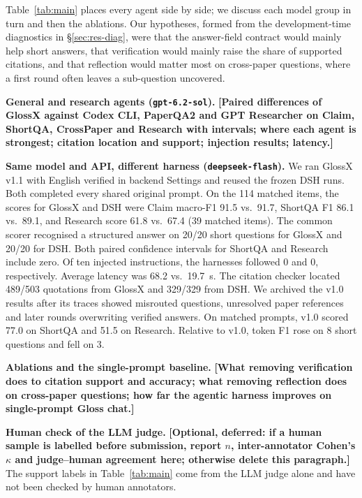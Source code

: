 \documentclass{article}
\newcommand{\sysname}{GlossX}
\newcommand{\gloss}{Gloss}
\newcommand{\ds}[1]{\textsf{#1}}
\newcommand{\TBD}[1]{\textcolor{glred}{\textbf{[#1]}}}
\newcommand{\code}[1]{\texttt{\small #1}}
\begin{document}
Table~\ref{tab:main} places every agent side by side; we discuss each model group in turn and then the ablations. Our hypotheses, formed from the development-time diagnostics in \S\ref{sec:res-diag}, were that the answer-field contract would mainly help short answers, that verification would mainly raise the share of supported citations, and that reflection would matter most on cross-paper questions, where a first round often leaves a sub-question uncovered.

\textbf{General and research agents (\code{gpt-6.2-sol}).} \TBD{Paired differences of \sysname{} against Codex CLI, PaperQA2 and GPT Researcher on \ds{Claim}, \ds{ShortQA}, \ds{CrossPaper} and \ds{Research} with intervals; where each agent is strongest; citation location and support; injection results; latency.}

\textbf{Same model and API, different harness (\code{deepseek-flash}).} We ran \sysname{} v1.1 with English verified in backend Settings and reused the frozen DSH runs. Both completed every shared original prompt. On the 114 matched items, the scores for \sysname{} and DSH were \ds{Claim} macro-F1 91.5 vs.\ 91.7, \ds{ShortQA} F1 86.1 vs.\ 89.1, and \ds{Research} score 61.8 vs.\ 67.4 (39 matched items). The common scorer recognised a structured answer on 20/20 short questions for \sysname{} and 20/20 for DSH. Both paired confidence intervals for ShortQA and Research include zero. Of ten injected instructions, the harnesses followed 0 and 0, respectively. Average latency was 68.2 vs.\ 19.7~s. The citation checker located 489/503 quotations from \sysname{} and 329/329 from DSH. We archived the v1.0 results after its traces showed misrouted questions, unresolved paper references and later rounds overwriting verified answers. On matched prompts, v1.0 scored 77.0 on ShortQA and 51.5 on Research. Relative to v1.0, token F1 rose on 8 short questions and fell on 3.

\textbf{Ablations and the single-prompt baseline.} \TBD{What removing verification does to citation support and accuracy; what removing reflection does on cross-paper questions; how far the agentic harness improves on single-prompt \gloss{} chat.}

\textbf{Human check of the LLM judge.} \TBD{Optional, deferred: if a human sample is labelled before submission, report $n$, inter-annotator Cohen's $\kappa$ and judge--human agreement here; otherwise delete this paragraph.} The support labels in Table~\ref{tab:main} come from the LLM judge alone and have not been checked by human annotators.
\end{document}
